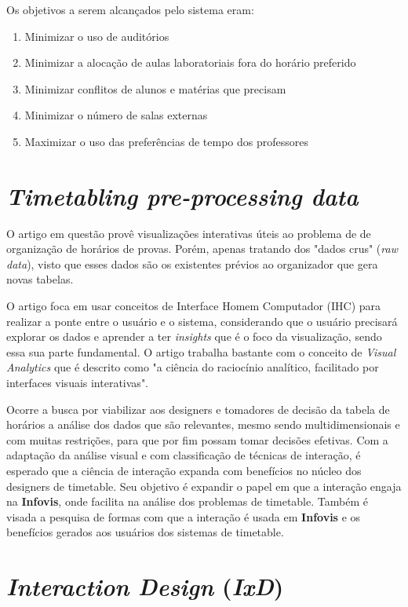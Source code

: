 Os objetivos a serem alcançados pelo sistema eram:

\begin{enumerate}
    \item Minimizar o uso de auditórios
    \item Minimizar a alocação de aulas laboratoriais fora do horário preferido
    \item Minimizar conflitos de alunos e matérias que precisam
    \item Minimizar o número de salas externas
    \item Maximizar o uso das preferências de tempo dos professores
\end{enumerate}

\section{\textit{Timetabling pre-processing data}}

O artigo em questão provê visualizações interativas úteis ao problema de de organização de horários de provas. Porém, apenas tratando dos "dados crus" (\textit{raw data}), visto que esses dados são os existentes prévios ao organizador que gera novas tabelas.

O artigo foca em usar conceitos de Interface Homem Computador (IHC) para realizar a ponte entre o usuário e o sistema, considerando que o usuário precisará explorar os dados e aprender a ter \textit{insights} que é o foco da visualização, sendo essa sua parte fundamental. O artigo trabalha bastante com o conceito de \textit{Visual Analytics} que é descrito como "a ciência do raciocínio analítico, facilitado por interfaces visuais interativas".

Ocorre a busca por viabilizar aos designers e tomadores de decisão da tabela de horários a análise dos dados que são relevantes, mesmo sendo multidimensionais e com muitas restrições, para que por fim possam tomar decisões efetivas. Com a adaptação da análise visual e com classificação de técnicas de interação, é esperado que a ciência de interação expanda com benefícios no núcleo dos designers de timetable. Seu objetivo é expandir o papel em que a interação engaja na \textbf{Infovis}, onde facilita na análise dos problemas de timetable. Também é visada a pesquisa de formas com que a interação é usada em \textbf{Infovis} e os benefícios gerados aos usuários dos sistemas de timetable.

\section{\textit{Interaction Design} (\textit{IxD})}

